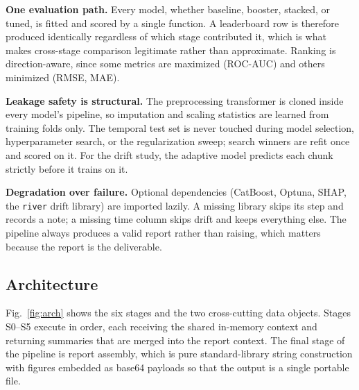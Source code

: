 \documentclass{ieeeaccess}
\begin{document}
\textbf{One evaluation path.} Every model, whether baseline, booster, stacked, or tuned, is fitted and scored by a single function. A leaderboard row is therefore produced identically regardless of which stage contributed it, which is what makes cross-stage comparison legitimate rather than approximate. Ranking is direction-aware, since some metrics are maximized (ROC-AUC) and others minimized (RMSE, MAE).

\textbf{Leakage safety is structural.} The preprocessing transformer is cloned inside every model's pipeline, so imputation and scaling statistics are learned from training folds only. The temporal test set is never touched during model selection, hyperparameter search, or the regularization sweep; search winners are refit once and scored on it. For the drift study, the adaptive model predicts each chunk strictly before it trains on it.

\textbf{Degradation over failure.} Optional dependencies (CatBoost, Optuna, SHAP, the \texttt{river} drift library) are imported lazily. A missing library skips its step and records a note; a missing time column skips drift and keeps everything else. The pipeline always produces a valid report rather than raising, which matters because the report is the deliverable.

\subsection{Architecture}
Fig.~\ref{fig:arch} shows the six stages and the two cross-cutting data objects. Stages S0--S5 execute in order, each receiving the shared in-memory context and returning summaries that are merged into the report context. The final stage of the pipeline is report assembly, which is pure standard-library string construction with figures embedded as base64 payloads so that the output is a single portable file.
\end{document}
